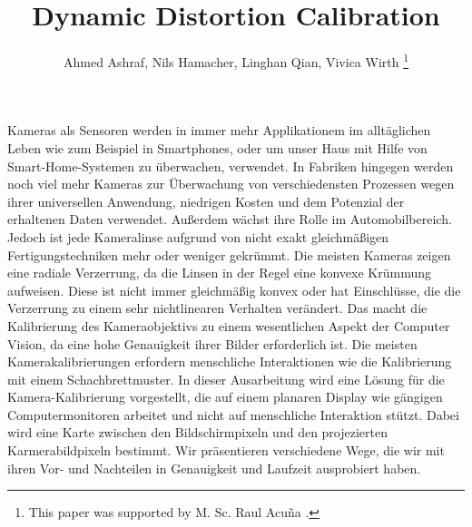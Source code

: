 \documentclass[journal,final,a4paper,twoside]{PS}
\begin{document}
\newcommand{\euertitel}{Dynamic Distortion Calibration}   %
\newcommand{\betreuer}{M. Sc. Raul Acu\~na }  %


\headsep 40pt
\title{\euertitel}
\author{Ahmed Ashraf,
        Nils Hamacher,
        Linghan Qian,
	Vivica Wirth
\thanks{This paper was supported by \betreuer.}}

\maketitle


\begin{Zusammenfassung}
Kameras als Sensoren werden in immer mehr Applikationem im allt\"aglichen Leben wie zum Beispiel in Smartphones, oder um unser Haus mit Hilfe von Smart-Home-Systemen zu \"uberwachen, verwendet. In Fabriken hingegen werden noch viel mehr Kameras zur \"Uberwachung von verschiedensten Prozessen wegen ihrer universellen Anwendung, niedrigen Kosten und dem Potenzial der erhaltenen Daten verwendet. Au\ss{}erdem w\"achst ihre Rolle im Automobilbereich. Jedoch ist jede Kameralinse aufgrund von nicht exakt gleichm\"a\ss{}igen Fertigungstechniken mehr oder weniger gekr\"ummt. Die meisten Kameras zeigen eine radiale Verzerrung, da die Linsen in der Regel eine konvexe Kr\"ummung aufweisen. Diese ist nicht immer gleichm\"a\ss{}ig konvex oder hat Einschl\"usse, die die Verzerrung zu einem sehr nichtlinearen Verhalten ver\"andert. Das macht die Kalibrierung des Kameraobjektivs zu einem wesentlichen Aspekt der Computer Vision, da eine hohe Genauigkeit ihrer Bilder erforderlich ist. Die meisten Kamerakalibrierungen erfordern menschliche Interaktionen wie die Kalibrierung mit einem Schachbrettmuster. In dieser Ausarbeitung wird eine L\"osung f\"ur die Kamera-Kalibrierung vorgestellt, die auf einem planaren Display wie g\"angigen Computermonitoren arbeitet und nicht auf menschliche Interaktion st\"utzt. Dabei wird eine Karte zwischen den Bildschirmpixeln und den projezierten Karmerabildpixeln bestimmt. Wir pr\"asentieren verschiedene Wege, die wir mit ihren Vor- und Nachteilen in Genauigkeit und Laufzeit ausprobiert haben.
\end{Zusammenfassung}
\vspace{6pt}
\end{document}
